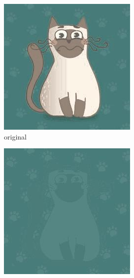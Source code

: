 \documentclass[12pt,a4paper]{article}
\begin{document}
    \begin{figure}[H]
    \centering %
\begin{subfigure}{0.25\textwidth}
  \includegraphics[width=\linewidth]{images/cartoon/original}
  \caption{original}
  \label{fig:1}
\end{subfigure}\hfil %
\begin{subfigure}{0.25\textwidth}
  \includegraphics[width=\linewidth]{images/cartoon/3-3-5-05}

\end{subfigure}
\end{figure}
\end{document}
